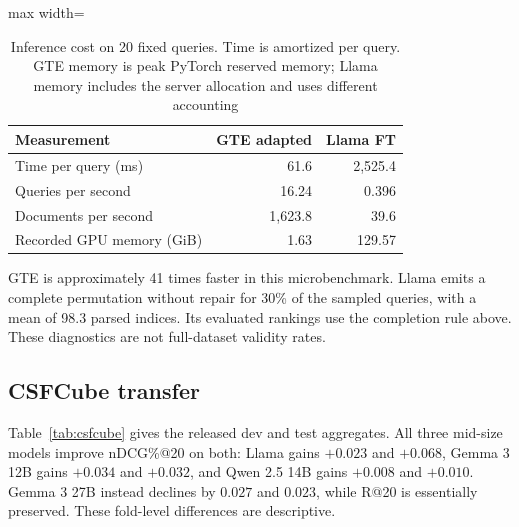 \documentclass[pdflatex,sn-basic,Numbered]{sn-jnl}%
\theoremstyle{thmstyleone}%
\theoremstyle{thmstyletwo}%
\theoremstyle{thmstylethree}%
\begin{document}
\begin{table}[ht]


\centering
\footnotesize
\setlength{\tabcolsep}{3pt}
\begin{adjustbox}{max width=\linewidth}
\begin{tabular}{l r r}
\hline
Measurement & GTE adapted & Llama FT \\
\hline
Time per query (ms) & 61.6 & 2,525.4 \\
Queries per second & 16.24 & 0.396 \\
Documents per second & 1,623.8 & 39.6 \\
Recorded GPU memory (GiB) & 1.63 & 129.57 \\
\hline
\end{tabular}
\end{adjustbox}


\caption{Inference cost on 20 fixed queries. Time is amortized per query. GTE memory is peak PyTorch reserved memory; Llama memory includes the server allocation and uses different accounting}
\label{tab:compact-compute}
\end{table}

GTE is approximately 41 times faster in this microbenchmark. 
Llama emits a complete permutation without repair for 30\% of the
sampled queries, with a mean of 98.3 parsed indices. Its evaluated rankings use
the completion rule above. These diagnostics are not full-dataset validity rates.

\subsection{CSFCube transfer}
Table~\ref{tab:csfcube} gives the released dev and test aggregates. All three
mid-size models improve nDCG\%@20 on both: Llama gains $+0.023$ and $+0.068$,
Gemma 3 12B gains $+0.034$ and $+0.032$, and Qwen 2.5 14B gains $+0.008$ and
$+0.010$. Gemma 3 27B instead declines by $0.027$ and $0.023$, while R@20
is essentially preserved. These fold-level differences are descriptive.
\end{document}
